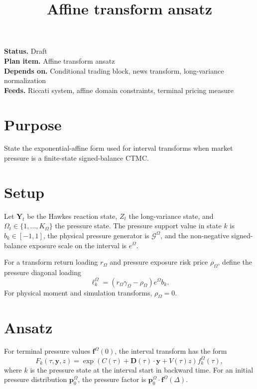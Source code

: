 \documentclass[11pt]{article}
\title{Affine transform ansatz}
\author{}
\date{}
\begin{document}
\maketitle

\noindent\textbf{Status.} Draft\\
\textbf{Plan item.} Affine transform ansatz\\
\textbf{Depends on.} Conditional trading block, news transform, long-variance normalization\\
\textbf{Feeds.} Riccati system, affine domain constraints, terminal pricing measure

\section{Purpose}

State the exponential-affine form used for interval transforms when market
pressure is a finite-state signed-balance CTMC.

\section{Setup}

Let \(\mathbf Y_t\) be the Hawkes reaction state, \(Z_t\) the long-variance
state, and \(\Omega_t\in\{1,\ldots,K_\Omega\}\) the pressure state.
The pressure support value in state \(k\) is \(b_k\in[-1,1]\), the physical
pressure generator is \(\mathcal G^\Omega\), and the non-negative
signed-balance exposure scale on the interval is \(e^\Omega\).

For a transform return loading \(r_\Omega\) and pressure exposure risk price
\(\rho_\Omega\), define the pressure diagonal loading
\[
    \ell_k^\Omega
    =
    (r_\Omega\gamma_\Omega-\rho_\Omega)e^\Omega b_k.
\]
For physical moment and simulation transforms, \(\rho_\Omega=0\).

\section{Ansatz}

For terminal pressure values \(\mathbf f^\Omega(0)\), the interval transform
has the form
\[
    F_k(\tau,\mathbf y,z)
    =
    \exp\!\left(C(\tau)+\mathbf D(\tau)\cdot\mathbf y+V(\tau)z\right)
    f_k^\Omega(\tau),
\]
where \(k\) is the pressure state at the interval start in backward time.
For an initial pressure distribution \(\mathbf p^\Omega_0\), the pressure
factor is \(\mathbf p^\Omega_0\cdot\mathbf f^\Omega(\Delta)\).
\end{document}
